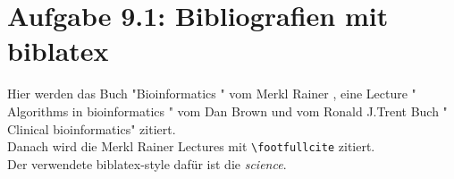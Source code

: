 \documentclass{article}
\begin{document}
\section*{Aufgabe 9.1: Bibliografien mit biblatex}

Hier werden das Buch "Bioinformatics " vom Merkl Rainer \cite{UBHD-67850616}, eine Lecture " Algorithms in bioinformatics " vom  Dan Brown \cite{UBHD-67739454} und vom  Ronald J.Trent Buch " Clinical bioinformatics" \cite{UBHD-67647031} zitiert.\\
Danach wird die Merkl Rainer Lectures  mit \verb|\footfullcite| zitiert.\\
Der verwendete biblatex-style dafür ist die  \textit{science}.

\printbibliography
\end{document}
